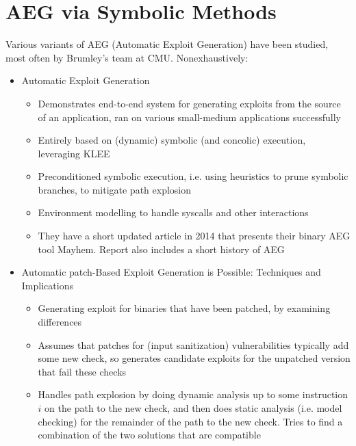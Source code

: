 \documentclass[11pt]{article}
\begin{document}
\section{AEG via Symbolic Methods}

Various variants of AEG (Automatic Exploit Generation) have been studied, most
often by Brumley's team at CMU. Nonexhaustively:

\begin{itemize}
\item
    Automatic Exploit Generation \cite{AEG}
    \begin{itemize}
    \item
        Demonstrates end-to-end system for generating exploits from the source
        of an application, ran on various small-medium applications successfully
    \item
        Entirely based on (dynamic) symbolic (and concolic) execution,
        leveraging KLEE
    \item
        Preconditioned symbolic execution, i.e. using heuristics to prune
        symbolic branches, to mitigate path explosion
    \item
        Environment modelling to handle syscalls and other interactions
    \item
        They have a short updated article in 2014 \cite{AEG14} that presents
        their binary AEG tool Mayhem. Report also includes a short history of
        AEG
    \end{itemize}

\item
    Automatic patch-Based Exploit Generation is Possible: Techniques and
    Implications \cite{APEG}
    \begin{itemize}
    \item
        Generating exploit for binaries that have been patched, by examining
        differences
    \item
        Assumes that patches for (input sanitization) vulnerabilities typically
        add some new check, so generates candidate exploits for the unpatched
        version that fail these checks
    \item
        Handles path explosion by doing dynamic analysis up to some instruction
        $i$ on the path to the new check, and then does static analysis
        (i.e. model checking) for the remainder of the path to the new check.
        Tries to find a combination of the two solutions that are compatible
    \end{itemize}


\end{itemize}
\end{document}
